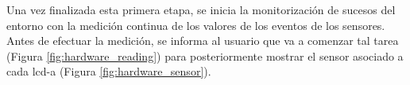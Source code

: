 \documentclass[12pt,a4paper, twoside]{report}
\begin{document}
	
	Una vez finalizada esta primera etapa, se inicia la monitorización de sucesos del entorno con la medición continua de los valores de los eventos de los sensores. Antes de efectuar la medición, se informa al usuario que va a comenzar tal tarea (Figura \ref{fig:hardware_reading}) para posteriormente mostrar el \gls{sensor} asociado a cada \gls{lcd-a} (Figura \ref{fig:hardware_sensor}).
	
%	
	
\end{document}

